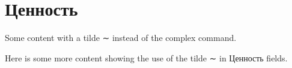 \section{Ценность}
Some content with a tilde ∼ instead of the complex command.

Here is some more content showing the use of the tilde ∼ in Ценность fields.